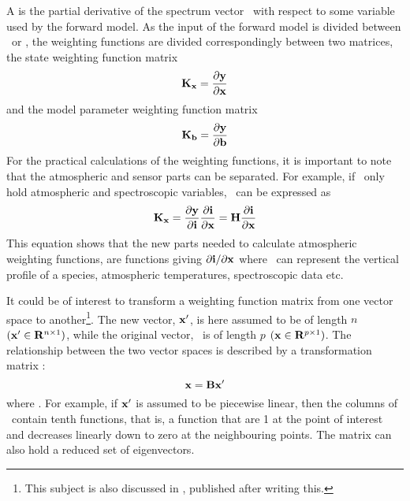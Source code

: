  A  is the partial derivative of the
 spectrum vector \MsrVct\ with respect to some variable used by the
 forward model. As the input of the forward model is divided between
 \SttVct\ or \FrwMdlVct, the weighting functions are divided
 correspondingly between two matrices, the state weighting function
 matrix
 \begin{equation}
   \mathbf{K}_{\mathbf{x}} = \frac{\partial \mathbf{y}}{\partial \mathbf{x}}
  \label{eq:formalism:kx}
 \end{equation}
 and the model parameter weighting function matrix
 \begin{equation}
   \mathbf{K}_{\mathbf{b}} = \frac{\partial \mathbf{y}}{\partial \mathbf{b}}
  \label{eq:formalism:kb}
 \end{equation}
 For the practical calculations of the weighting functions, it is
 important to note that the atmospheric and sensor parts can be
 separated. For example, if \SttVct\ only hold atmospheric and
 spectroscopic variables, \aWfnMtr{\SttVct}\ can be expressed as
 \begin{equation}
   \mathbf{K}_{\mathbf{x}} = \frac{\partial \mathbf{y}}{\partial \mathbf{i}}
                 \frac{\partial \mathbf{i}}{\partial \mathbf{x}} =
         \mathbf{H} \frac{\partial \mathbf{i}}{\partial \mathbf{x}}
  \label{eq:formalism:kx2}
 \end{equation}
 This equation shows that the new parts needed to calculate
 atmospheric weighting functions, are functions giving $\partial\mathbf{i} /
 \partial \mathbf{x}$ where \SttVct\ can represent the vertical profile of a
 species, atmospheric temperatures, spectroscopic data etc.


 
 It could be of interest to transform a weighting function matrix from
 one vector space to another\footnote{This subject is also discussed
   in \citet{rodgers:00}, published after writing this.}. The new
 vector, $\mathbf{x}'$, is here assumed to be of length $n$ $(\mathbf{x}' \in
 \mathbf{R}^{n \times 1})$, while the original vector, \SttVct\ is of length $p$
 $(\mathbf{x} \in \mathbf{R}^{p \times 1})$. The relationship between the two vector
 spaces is described by a transformation matrix \VctTrfMtr:
  \begin{equation}
    \mathbf{x} = \mathbf{B} \mathbf{x}'
  \end{equation}
  where \VctTrfMtr \SzeSmb {}. For example, if $\mathbf{x}'$
  is assumed to be piecewise linear, then the columns of \VctTrfMtr\ contain
  tenth functions, that is, a function that are 1 at the point of
  interest and decreases linearly down to zero at the neighbouring
  points.  The matrix can also hold a reduced set of eigenvectors.
    
